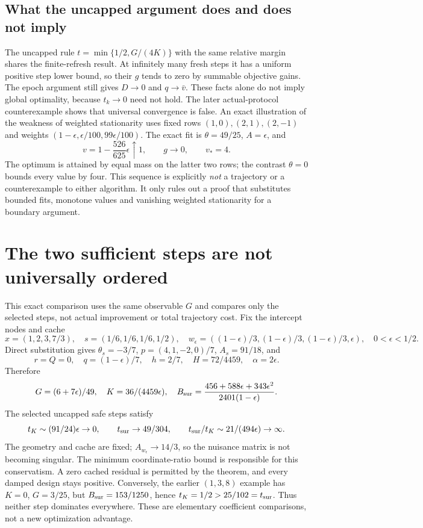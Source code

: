 \documentclass[11pt]{article}
\begin{document}
\subsection{What the uncapped argument does and does not imply}
The uncapped rule $t=\min\{1/2,G/(4K)\}$ with the same relative margin shares the finite-refresh result. At infinitely many fresh steps it has a uniform positive step lower bound, so their $g$ tends to zero by summable objective gains. The epoch argument still gives $D\to0$ and $q\to\bar v$. These facts alone do not imply global optimality, because $t_k\to0$ need not hold. The later actual-protocol counterexample shows that universal convergence is false.
An exact illustration of the weakness of weighted stationarity uses fixed rows
$(1,0),(2,1),(2,-1)$ and weights
$(1-\epsilon,\epsilon/100,99\epsilon/100)$.
The exact fit is $\theta=49/25$, $A=\epsilon$, and
\[
 v=1-\frac{526}{625}\epsilon\uparrow1,
 \qquad g\to0,\qquad v_*=4.
\]
The optimum is attained by equal mass on the latter two rows; the contrast $\theta=0$ bounds every value by four. This sequence is explicitly \emph{not} a trajectory or a counterexample to either algorithm. It only rules out a proof that substitutes bounded fits, monotone values and vanishing weighted stationarity for a boundary argument.

\section{The two sufficient steps are not universally ordered}
This exact comparison uses the same observable $G$ and compares only the selected steps, not actual improvement or total trajectory cost. Fix the intercept nodes and cache
\[
 x=(1,2,3,7/3),\quad s=(1/6,1/6,1/6,1/2),\quad
 w_\epsilon=((1-\epsilon)/3,(1-\epsilon)/3,(1-\epsilon)/3,\epsilon),
 \quad0<\epsilon<1/2.
\]
Direct substitution gives $\theta_s=-3/7$, $p=(4,1,-2,0)/7$, $A_s=91/18$, and
\[
 r=Q=0,\quad q=(1-\epsilon)/7,\quad h=2/7,\quad
 H=72/4459,\quad\alpha=2\epsilon.
\]
Therefore
\[
 G=(6+7\epsilon)/49,\quad K=36/(4459\epsilon),\quad
 B_{\rm sur}=\frac{456+588\epsilon+343\epsilon^2}{2401(1-\epsilon)}.
\]
The selected uncapped safe steps satisfy
\[
 t_K\sim(91/24)\epsilon\to0,\qquad
 t_{\rm sur}\to49/304,\qquad
 t_{\rm sur}/t_K\sim21/(494\epsilon)\to\infty.
\]
The geometry and cache are fixed; $A_{w_\epsilon}\to14/3$, so the nuisance matrix is not becoming singular. The minimum coordinate-ratio bound is responsible for this conservatism. A zero cached residual is permitted by the theorem, and every damped design stays positive.
Conversely, the earlier $(1,3,8)$ example has $K=0$, $G=3/25$, but $B_{\rm sur}=153/1250$, hence $t_K=1/2>25/102=t_{\rm sur}$. Thus neither step dominates everywhere. These are elementary coefficient comparisons, not a new optimization advantage.
\end{document}
